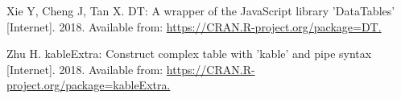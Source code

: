 \documentclass[
  11pt,
  a4paper,
  krantz2]{krantz}
\newlength{\cslhangindent}
\newenvironment{CSLReferences}[2] %
 {\begin{list}{}{%
  \setlength{\itemindent}{0pt}
  \setlength{\leftmargin}{0pt}
  \setlength{\parsep}{0pt}
  \ifodd #1
   \setlength{\leftmargin}{\cslhangindent}
   \setlength{\itemindent}{-1\cslhangindent}
  \fi
  \setlength{\itemsep}{#2\baselineskip}}}
 {\end{list}}
\begin{document}
\begin{footnotesize}
\begin{CSLReferences}{1}{0}
Xie Y, Cheng J, Tan X. {DT}: A wrapper of the JavaScript library 'DataTables' {[}Internet{]}. 2018. Available from: \href{https://CRAN.R-project.org/package=DT}{https://CRAN.R-project.org/package=DT.}

Zhu H. {kableExtra}: Construct complex table with 'kable' and pipe syntax {[}Internet{]}. 2018. Available from: \href{https://CRAN.R-project.org/package=kableExtra}{https://CRAN.R-project.org/package=kableExtra.}

\end{CSLReferences}

\backmatter
{\small\printindex}


\end{footnotesize} %
\end{document}
